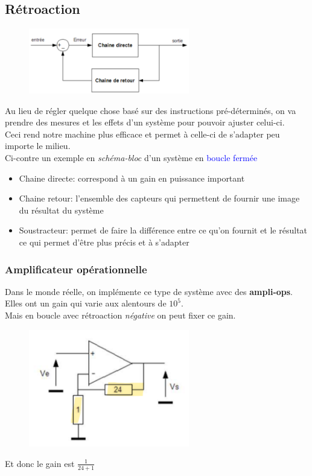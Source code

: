 \documentclass{report}
\begin{document}
\subsection{Rétroaction}
\begin{figure}
\centering
\includegraphics[width=7cm]{img/Bloc.png} \label{img:ampli}
\end{figure}
Au lieu de régler quelque chose basé sur des instructions pré-déterminés, on va prendre des mesures et les effets d'un système pour pouvoir ajuster celui-ci.\\
Ceci rend notre machine plus efficace et permet à celle-ci de s'adapter peu importe le milieu.\\
Ci-contre un exemple en \textit{schéma-bloc} d'un système en \textcolor{blue}{boucle fermée}\\
\begin{itemize}
\item Chaine directe: correspond à un gain en puissance important
\item Chaine retour: l'ensemble des capteurs qui permettent de fournir une image du résultat du système
\item Soustracteur: permet de faire la différence entre ce qu'on fournit et le résultat ce qui permet d'être plus précis et à s'adapter
\end{itemize}

\subsubsection{Amplificateur opérationnelle}
Dans le monde réelle, on implémente ce type de système avec des \textbf{ampli-ops}. Elles ont un gain qui varie aux alentours de $10^5$.\\
Mais en boucle avec rétroaction \textit{négative} on peut fixer ce gain.
\begin{figure}[H]
\centering
\includegraphics[width=7cm]{img/ampli.png} 
\end{figure}
Et donc le gain est $\frac{1}{24+1}$
\end{document}
